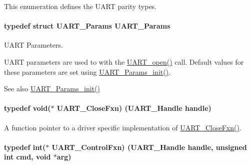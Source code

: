 This enumeration defines the U\+A\+R\+T parity types. 
\paragraph[{U\+A\+R\+T\+\_\+\+Params}]{\setlength{\rightskip}{0pt plus 5cm}typedef struct {\bf U\+A\+R\+T\+\_\+\+Params}  {\bf U\+A\+R\+T\+\_\+\+Params}}\label{_u_a_r_t_8h_a533d172a10c22e1e5b94e9d0a055d882}


U\+A\+R\+T Parameters. 

U\+A\+R\+T parameters are used to with the \hyperlink{_u_a_r_t_8h_a0442ea1ec23901168da31726bb3254c1}{U\+A\+R\+T\+\_\+open()} call. Default values for these parameters are set using \hyperlink{_u_a_r_t_8h_a40e5c0823bb7ffd2e8fbf19f9f20b399}{U\+A\+R\+T\+\_\+\+Params\+\_\+init()}.

\begin{DoxySeeAlso}{See also}
\hyperlink{_u_a_r_t_8h_a40e5c0823bb7ffd2e8fbf19f9f20b399}{U\+A\+R\+T\+\_\+\+Params\+\_\+init()} 
\end{DoxySeeAlso}
\paragraph[{U\+A\+R\+T\+\_\+\+Close\+Fxn}]{\setlength{\rightskip}{0pt plus 5cm}typedef void($\ast$ U\+A\+R\+T\+\_\+\+Close\+Fxn) ({\bf U\+A\+R\+T\+\_\+\+Handle} handle)}\label{_u_a_r_t_8h_ae08ff15291bd6b21cb4e2eb1fce164a6}


A function pointer to a driver specific implementation of \hyperlink{_u_a_r_t_8h_ae08ff15291bd6b21cb4e2eb1fce164a6}{U\+A\+R\+T\+\_\+\+Close\+Fxn()}. 

\paragraph[{U\+A\+R\+T\+\_\+\+Control\+Fxn}]{\setlength{\rightskip}{0pt plus 5cm}typedef int($\ast$ U\+A\+R\+T\+\_\+\+Control\+Fxn) ({\bf U\+A\+R\+T\+\_\+\+Handle} handle, unsigned int cmd, void $\ast$arg)}\label{_u_a_r_t_8h_a4fc98447e6dd805e2d072917e8e6da3b}


